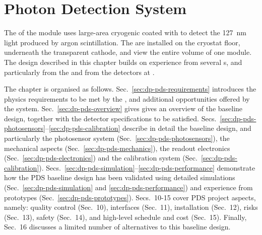 \chapter{Photon Detection System}
\label{ch:dp-pds}

The  of the \dune \dual module uses large-area cryogenic  coated with  to detect the \SI{127}{\nm} light produced by argon scintillation. The  are installed on the cryostat floor, underneath the  transparent cathode, and view the entire \lar volume of one  module. The design described in this chapter builds on experience from several \lartpc{}s, and particularly from the  and from the  detectors at . 

The chapter is organised as follows. Sec.~\ref{sec:dp-pds-requirements} introduces the physics requirements to be met by the , and additional opportunities offered by the system. Sec.~\ref{sec:dp-pds-overview} gives gives an overview of the  baseline design, together with the detector specifications to be satisfied. Secs.~\ref{sec:dp-pds-photosensors}--\ref{sec:dp-pds-calibration} describe in detail the  baseline design, and particularly the  photosensor system (Sec.~\ref{sec:dp-pds-photosensors}), the mechanical aspects (Sec.~\ref{sec:dp-pds-mechanics}),  the readout electronics (Sec.~\ref{sec:dp-pds-electronics}) and the calibration system (Sec.~\ref{sec:dp-pds-calibration}). Secs.~\ref{sec:dp-pds-simulation}--\ref{sec:dp-pds-performance} demonstrate how the PDS baseline design has been validated using detailed simulations (Sec.~\ref{sec:dp-pds-simulation} and \ref{sec:dp-pds-performance}) and experience from prototypes (Sec.~\ref{sec:dp-pds-prototypes}). Secs.~10-15 cover PDS project aspects, namely: quality control (Sec.~10), interfaces (Sec.~11), installation (Sec.~12), risks (Sec.~13), safety (Sec.~14), and high-level schedule and cost (Sec.~15). Finally, Sec.~16 discusses a limited number of alternatives to this baseline design.  
















